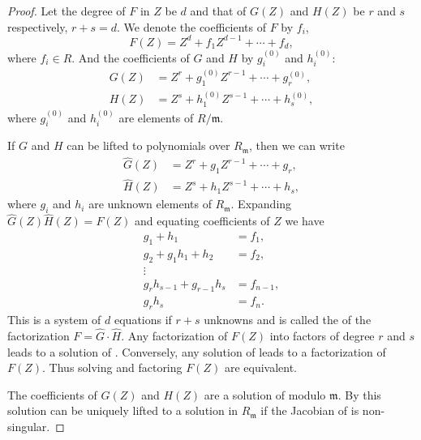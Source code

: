 \begin{proof}
Let the degree of $F$ in $Z$ be $d$ and that of $G(Z)$ and $H(Z)$ be
$r$ and $s$ respectively, $r+s = d$.  We denote the coefficients of
$F$ by $f_i$,
\[
F(Z) = Z^d + f_1 Z^{d-1} + \cdots + f_d,
\]
where $f_i \in R$.  And the coefficients of $G$ and $H$ by $g^{(0)}_i$
and $h^{(0)}_i$:
\[
\begin{aligned}
G(Z) &= Z^r + g^{(0)}_1 Z^{r-1} + \cdots + g^{(0)}_r, \\
H(Z) &= Z^s + h^{(0)}_1 Z^{s-1} + \cdots + h^{(0)}_s,
\end{aligned}
\]
where $g^{(0)}_i$ and $h^{(0)}_i$ are elements of $R/\mathfrak{m}$.

If $G$ and $H$ can be lifted to polynomials over
$R_\mathfrak{m}$, then we can write
\[
\begin{aligned}
\hat{G}(Z) & = Z^r + g_1 Z^{r-1} + \cdots + g_r, \\
\hat{H}(Z) & = Z^s + h_1 Z^{s-1} + \cdots + h_s, 
\end{aligned}
\]
where $g_i$ and $h_i$ are unknown elements of $R_\mathfrak{m}$.
Expanding $\hat{G}(Z) \hat{H}(Z) = F(Z)$ and equating coefficients of
$Z$ we have
\begin{equation}\label{Hensel:Eq}
\begin{aligned}
  g_1 + h_1&= f_1,\\
  g_2 + g_1h_1 + h_2&= f_2,\\
  \vdots&\\
  g_r h_{s-1} + g_{r-1} h_s&= f_{n-1},\\
  g_r h_s&= f_n.
\end{aligned}
\end{equation}
This is a system of $d$ equations if $r+s$ unknowns and is called the
 of the factorization $F = \hat{G}\cdot
\hat{H}$.  Any factorization of $F(Z)$ into factors of degree $r$ and
$s$ leads to a solution of .  Conversely, any
solution of  leads to a factorization of $F(Z)$.
Thus solving  and factoring $F(Z)$ are equivalent. 

The coefficients of $G(Z)$ and $H(Z)$ are a solution of
 modulo $\mathfrak{m}$.  By  this
solution can be uniquely lifted to a solution in $R_\mathfrak{m}$ if the
Jacobian of  is non-singular.


\end{proof}
